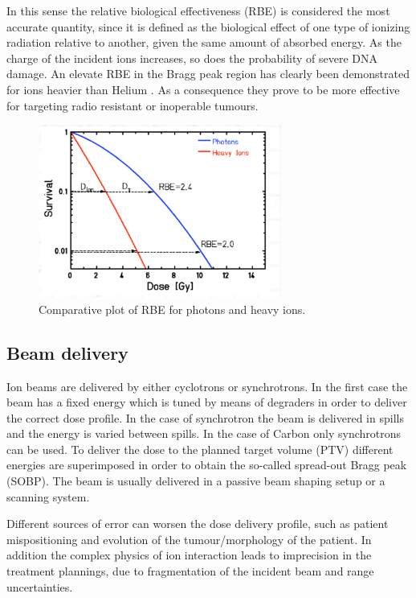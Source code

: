 In this sense the relative biological effectiveness (RBE) is considered the most accurate quantity, since it is defined as the biological effect of one type of ionizing radiation relative to another, given the same amount of absorbed energy. As the charge of the incident ions increases, so does the probability of severe DNA damage. An elevate RBE in the Bragg peak region has clearly been demonstrated for ions heavier than Helium  \cite{Linz2011}.
As a consequence they prove to be more effective for targeting radio resistant or inoperable tumours.

\begin{figure}  
\centering
\includegraphics[width=8cm]{Pictures/Chapter_1/rbe.pdf}
\caption[RBE comparison]{Comparative plot of RBE for photons and heavy ions.}
\label{fig:rbe}
\end{figure}

\subsection{Beam delivery}

Ion beams are delivered by either cyclotrons or synchrotrons. In the first case the beam has a fixed energy which is tuned by means of degraders in order to deliver the correct dose profile. In the case of synchrotron the beam is delivered in spills and the energy is varied between spills. In the case of Carbon only synchrotrons can be used.
To deliver the dose to the planned target volume (PTV) different energies are superimposed in order to obtain the so-called spread-out Bragg peak (SOBP). The beam is usually delivered in a passive beam shaping setup or a scanning system. 

Different sources of error can worsen the dose delivery profile, such as patient mispositioning and evolution of the tumour/morphology of the patient. In addition the complex physics of ion interaction leads to imprecision in the treatment plannings, due to fragmentation of the incident beam and range uncertainties.

